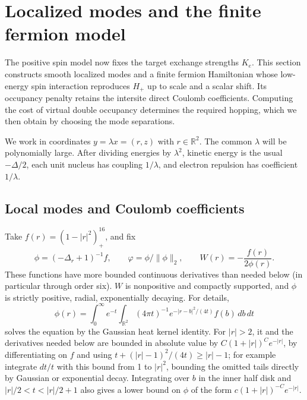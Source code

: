 \section{Localized modes and the finite fermion model}\label{sec:wells}

The positive spin model now fixes the target exchange strengths $K_e$.
This section constructs smooth localized modes and a finite fermion
Hamiltonian whose low-energy spin interaction reproduces $H_+$ up to
scale and a scalar shift. Its occupancy
penalty retains the intersite direct Coulomb coefficients. Computing the
cost of virtual double occupancy determines the required hopping, which
we then obtain by choosing the mode separations.

We work in coordinates \(y=\lambda x=(r,z)\) with \(r\in\mathbb R^2\). The common \(\lambda\) will be polynomially large. After dividing energies by \(\lambda^2\), kinetic energy is the usual \(-\Delta/2\), each unit nucleus has coupling \(1/\lambda\), and electron repulsion has coefficient \(1/\lambda\).

\subsection{Local modes and Coulomb coefficients}\label{subsec:local-modes}

Take \(f(r)=(1-|r|^2)_+^{16}\), and fix
\[
 \phi=(-\Delta_r+1)^{-1}f,\qquad \varphi=\phi/\|\phi\|_2,\qquad
 W(r)=-\frac{f(r)}{2\phi(r)} .
\]
These functions have more bounded continuous derivatives than needed below (in particular through order six). \(W\) is nonpositive and compactly supported, and \(\phi\) is strictly positive, radial, exponentially decaying. For details,
\[
  \phi(r)=\int_0^\infty e^{-t}\int_{\mathbb R^2}
   (4\pi t)^{-1}e^{-|r-b|^2/(4t)} f(b)\,db\,dt
\]
solves the equation by the Gaussian heat kernel identity. For \(|r|>2\), it and the derivatives needed below are bounded in absolute value by \(C(1+|r|)^C e^{-|r|}\), by differentiating on \(f\) and using \(t+(|r|-1)^2/(4t)\ge |r|-1\); for example integrate \(dt/t\) with this bound from 1 to \(|r|^2\), bounding the omitted tails directly by Gaussian or exponential decay. Integrating over \(b\) in the inner half disk and \(|r|/2<t<|r|/2+1\) also gives a lower bound on \(\phi\) of the form \(c(1+|r|)^{-C}e^{-|r|}\).

